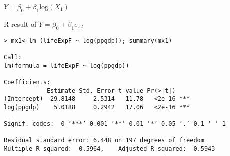 \documentclass[xcolor=dvipsnames]{beamer}
\begin{document}
\begin{frame}{$Y=\beta_{0}+\beta_{1}\textrm{log}(X_{1})$}
\begin{center}
\end{center}
\end{frame}
\begin{frame}[fragile=singleslide]{R result of $Y=\beta_{0}+\beta_{1}e_{x2}$}
\begin{Verbatim}[frame=single,label=R code,
fontseries=b,xleftmargin=2mm,commandchars=\\\{\},
formatcom=\color{blue}]
> mx1<-lm (lifeExpF ~ log(ppgdp)); summary(mx1)

Call:
lm(formula = lifeExpF ~ log(ppgdp))

Coefficients:
            Estimate Std. Error t value Pr(>|t|)    
(Intercept)  29.8148     2.5314   11.78   <2e-16 ***
log(ppgdp)    5.0188     0.2942   17.06   <2e-16 ***
---
Signif. codes:  0 ‘***’ 0.001 ‘**’ 0.01 ‘*’ 0.05 ‘.’ 0.1 ‘ ’ 1

Residual standard error: 6.448 on 197 degrees of freedom
Multiple R-squared:  0.5964,	Adjusted R-squared:  0.5943 
\end{Verbatim}
\end{frame}
\end{document}
